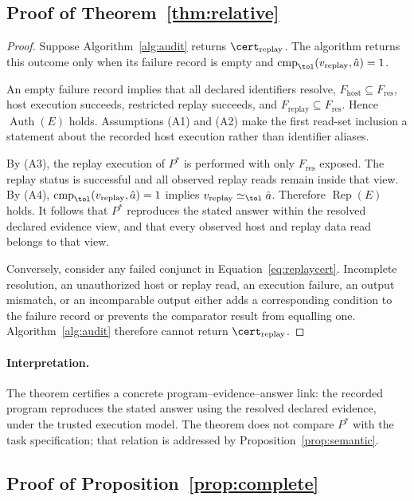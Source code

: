 \subsection{Proof of Theorem~\ref{thm:relative}}

\begin{proof}
Suppose Algorithm~\ref{alg:audit} returns
$\cert_{\mathrm{replay}}$. The algorithm returns this outcome only
when its failure record is empty and
$\operatorname{cmp}_{\tol}
(v_{\mathrm{replay}},\hat a)=1$.

An empty failure record implies that all declared identifiers
resolve, $F_{\mathrm{host}}\subseteq F_{\mathrm{res}}$, host
execution succeeds, restricted replay succeeds, and
$F_{\mathrm{replay}}\subseteq F_{\mathrm{res}}$. Hence
$\operatorname{Auth}(E)$ holds. Assumptions (A1) and (A2) make the
first read-set inclusion a statement about the recorded host
execution rather than identifier aliases.

By (A3), the replay execution of $P^*$ is performed with only
$F_{\mathrm{res}}$ exposed. The replay status is successful and
all observed replay reads remain inside that view. By (A4),
$\operatorname{cmp}_{\tol}
(v_{\mathrm{replay}},\hat a)=1$ implies
$v_{\mathrm{replay}}\simeq_{\tol}\hat a$. Therefore
$\operatorname{Rep}(E)$ holds. It follows that $P^*$ reproduces
the stated answer within the resolved declared evidence view, and
that every observed host and replay data read belongs to that
view.

Conversely, consider any failed conjunct in
Equation~\ref{eq:replaycert}. Incomplete resolution, an
unauthorized host or replay read, an execution failure, an output
mismatch, or an incomparable output either adds a corresponding
condition to the failure record or prevents the comparator result
from equalling one. Algorithm~\ref{alg:audit} therefore cannot
return $\cert_{\mathrm{replay}}$.
\end{proof}

\paragraph{Interpretation.}
The theorem certifies a concrete program--evidence--answer link:
the recorded program reproduces the stated answer using the
resolved declared evidence, under the trusted execution model.
The theorem does not compare $P^*$ with the task specification;
that relation is addressed by
Proposition~\ref{prop:semantic}.

\subsection{Proof of Proposition~\ref{prop:complete}}

